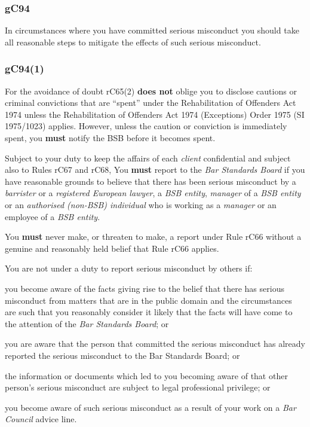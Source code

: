 

\subsubsection{\color{darkgrey}gC94}

In circumstances where you have committed serious misconduct you should
take all reasonable steps to mitigate the effects of such serious
misconduct.

\subsubsection{\color{darkgrey}gC94(1)}

For the avoidance of doubt rC65(2) \textcolor{myred}{\textbf{does not}} oblige you to disclose
cautions or criminal convictions that are ``spent'' under the
Rehabilitation of Offenders Act 1974 unless the Rehabilitation of
Offenders Act 1974 (Exceptions) Order 1975 (SI 1975/1023) applies.
However, unless the caution or conviction is immediately spent, you \textcolor{myred}{\textbf{must}}
notify the BSB before it becomes spent.




Subject to your duty to keep the affairs of each \emph{client}
confidential and subject also to Rules rC67 and rC68, You \textcolor{myred}{\textbf{must}} report to
the \emph{Bar Standards Board} if you have reasonable grounds to believe
that there has been serious misconduct by a \emph{barrister} or a
\emph{registered European lawyer}, a \emph{BSB entity}, \emph{manager}
of a \emph{BSB entity} or an \emph{authorised (non-BSB) individual} who
is working as a \emph{manager} or an employee of a \emph{BSB entity}.


You \textcolor{myred}{\textbf{must}} never make, or threaten to make, a report under Rule rC66
without a genuine and reasonably held belief that Rule rC66 applies.


You are not under a duty to report serious misconduct by others if:
\begin{numlist}\item you become aware of the facts giving rise to the belief that there
has serious misconduct from matters that are in the public domain and
the circumstances are such that you reasonably consider it likely that
the facts will have come to the attention of the \emph{Bar Standards
Board}; or
\item you are aware that the person that committed the serious misconduct
has already reported the serious misconduct to the Bar Standards Board;
or
\item the information or documents which led to you becoming aware of that
other person's serious misconduct are subject to legal professional
privilege; or
\item you become aware of such serious misconduct as a result of your work
on a \emph{Bar Council} advice line.
\end{numlist}

